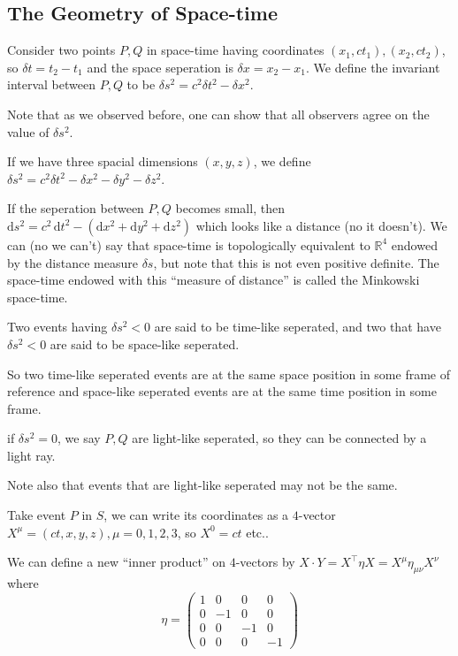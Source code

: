 \subsection{The Geometry of Space-time}
\begin{definition}
    Consider two points $P,Q$ in space-time having coordinates $(x_1,ct_1),(x_2,ct_2)$, so $\delta t=t_2-t_1$ and the space seperation is $\delta x=x_2-x_1$.
    We define the invariant interval between $P,Q$ to be $\delta s^2=c^2\delta t^2-\delta x^2$.
\end{definition}
Note that as we observed before, one can show that all observers agree on the value of $\delta s^2$.
\begin{definition}
    If we have three spacial dimensions $(x,y,z)$, we define $\delta s^2=c^2\delta t^2-\delta x^2-\delta y^2-\delta z^2$.
\end{definition}
If the seperation between $P,Q$ becomes small, then $\mathrm ds^2=c^2\,\mathrm dt^2-(\mathrm dx^2+\mathrm dy^2+\mathrm dz^2)$ which looks like a distance (no it doesn't).
We can (no we can't) say that space-time is topologically equivalent to $\mathbb R^4$ endowed by the distance measure $\delta s$, but note that this is not even positive definite.
The space-time endowed with this ``measure of distance'' is called the Minkowski space-time.
\begin{definition}
    Two events having $\delta s^2<0$ are said to be time-like seperated, and two that have $\delta s^2<0$ are said to be space-like seperated.
\end{definition}
So two time-like seperated events are at the same space position in some frame of reference and space-like seperated events are at the same time position in some frame.
\begin{definition}
    if $\delta s^2=0$, we say $P,Q$ are light-like seperated, so they can be connected by a light ray.
\end{definition}
Note also that events that are light-like seperated may not be the same.
\begin{definition}
    Take event $P$ in $S$, we can write its coordinates as a $4$-vector $X^\mu=(ct,x,y,z),\mu=0,1,2,3$, so $X^0=ct$ etc..
\end{definition}
We can define a new ``inner product'' on $4$-vectors by $X\cdot Y=X^\top\eta X=X^\mu\eta_{\mu\nu}X^\nu$ where
$$\eta=\begin{pmatrix}
    1&0&0&0\\
    0&-1&0&0\\
    0&0&-1&0\\
    0&0&0&-1
\end{pmatrix}$$
